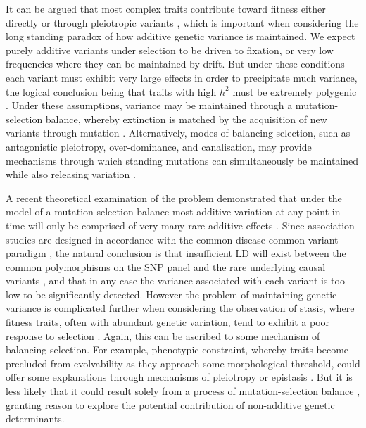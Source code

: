 It can be argued that most complex traits contribute toward fitness either directly or through pleiotropic variants \citep{Merila1999}, which is important when considering the long standing paradox of how additive genetic variance is maintained. We expect purely additive variants under selection to be driven to fixation, or very low frequencies where they can be maintained by drift. But under these conditions each variant must exhibit very large effects in order to precipitate much variance, the logical conclusion being that traits with high $h^2$ must be extremely polygenic \citep{Lande1975,Phillips2007}. Under these assumptions, variance may be maintained through a mutation-selection balance, whereby extinction is matched by the acquisition of new variants through mutation \citep{Hill1982}. Alternatively, modes of balancing selection, such as antagonistic pleiotropy, over-dominance, and canalisation, may provide mechanisms through which standing mutations can simultaneously be maintained while also releasing variation \citep{Lynch1990,Kaneko2009,Siegal2002,Waddington1942,Bergman2003}.

A recent theoretical examination of the problem demonstrated that under the model of a mutation-selection balance most additive variation at any point in time will only be comprised of very many rare additive effects \citep{Eyre-Walker2010}. Since association studies are designed in accordance with the common disease-common variant paradigm \citep{peng2007}, the natural conclusion is that insufficient LD will exist between the common polymorphisms on the SNP panel and the rare underlying causal variants \citep{Schork2000}, and that in any case the variance associated with each variant is too low to be significantly detected. However the problem of maintaining genetic variance is complicated further when considering the observation of stasis, where fitness traits, often with abundant genetic variation, tend to exhibit a poor response to selection \citep{Bradshaw1991}. Again, this can be ascribed to some mechanism of balancing selection. For example, phenotypic constraint, whereby traits become precluded from evolvability as they approach some morphological threshold, could offer some explanations through mechanisms of pleiotropy or epistasis \citep{Walker2007,Galis2007}. But it is less likely that it could result solely from a process of mutation-selection balance \citep{Barton2002}, granting reason to explore the potential contribution of non-additive genetic determinants.

